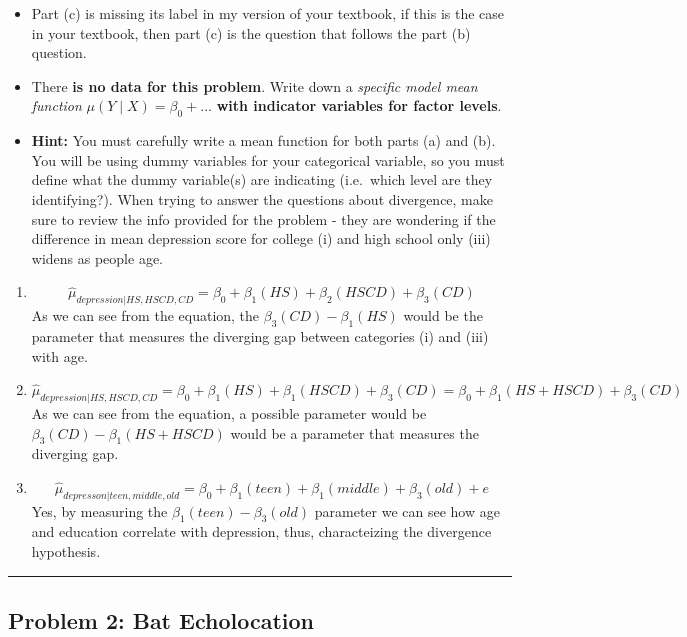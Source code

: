 \documentclass[
]{article}
\begin{document}
\begin{itemize}
\item
  Part (c) is missing its label in my version of your textbook, if this
  is the case in your textbook, then part (c) is the question that
  follows the part (b) question.
\item
  There \textbf{is no data for this problem}. Write down a
  \emph{specific model mean function} \(\mu(Y \mid X) = \beta_0 + ...\)
  \textbf{with indicator variables for factor levels}.
\item
  \textbf{Hint:} You must carefully write a mean function for both parts
  (a) and (b). You will be using dummy variables for your categorical
  variable, so you must define what the dummy variable(s) are indicating
  (i.e.~which level are they identifying?). When trying to answer the
  questions about divergence, make sure to review the info provided for
  the problem - they are wondering if the difference in mean depression
  score for college (i) and high school only (iii) widens as people age.
\end{itemize}

\begin{enumerate}
\def\labelenumi{\alph{enumi})}
\item
  \[
  \hat \mu_{depression|HS,HSCD,CD} = \beta_{0} + \beta_{1}(HS) + \beta_{2}(HSCD) + \beta_{3}(CD)
  \] As we can see from the equation, the
  \(\beta_{3}(CD) - \beta_{1}(HS)\) would be the parameter that measures
  the diverging gap between categories (i) and (iii) with age.
\item
  \[
  \hat \mu_{depression|HS,HSCD,CD} = \beta_{0} + \beta_{1}(HS) + \beta_{1}(HSCD) + \beta_{3}(CD)= \beta_{0} + \beta_{1}(HS+HSCD) + \beta_{3}(CD)
  \] As we can see from the equation, a possible parameter would be
  \(\beta_{3}(CD) - \beta_{1}(HS + HSCD)\) would be a parameter that
  measures the diverging gap.
\item
  \[
  \hat \mu_{depresson|teen,middle,old} = \beta_{0} + \beta_{1}(teen) + \beta_{1}(middle) + \beta_{3}(old) + e
  \] Yes, by measuring the \(\beta_{1}(teen) - \beta_{3}(old)\)
  parameter we can see how age and education correlate with depression,
  thus, characteizing the divergence hypothesis.
\end{enumerate}

\begin{center}\rule{0.5\linewidth}{0.5pt}\end{center}

\hypertarget{problem-2-bat-echolocation}{%
\subsection{Problem 2: Bat
Echolocation}\label{problem-2-bat-echolocation}}
\end{document}

